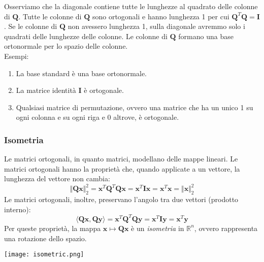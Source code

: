 \documentclass{article}
\begin{document}
            Osserviamo che la diagonale contiene tutte le lunghezze al quadrato delle colonne di $\mathbf{Q}$. 
            Tutte le colonne di $\mathbf{Q}$ sono ortogonali e hanno lunghezza 1 per cui $\mathbf{Q}^T\mathbf{Q} = \mathbf{I}$. Se le colonne 
            di $\mathbf{Q}$ non avessero lunghezza 1, sulla diagonale avremmo solo i quadrati delle lunghezze delle colonne. 
            Le colonne di $\mathbf{Q}$ formano una base ortonormale per lo spazio delle colonne. \\
            Esempi:
            \begin{enumerate}
                \item La base standard è una base ortonormale.
                \item La matrice identità $\mathbf{I}$ è ortogonale.
                \item Qualsiasi matrice di permutazione, ovvero una matrice che ha un unico 1 su ogni colonna e su ogni riga e 0 altrove, 
                 è ortogonale.
            \end{enumerate}


            \subsubsection{Isometria}
                Le matrici ortogonali, in quanto matrici, modellano delle mappe lineari. Le matrici ortogonali hanno la proprietà che,
                quando applicate a un vettore, la lunghezza del vettore non cambia:
                \[ \Vert \mathbf{Qx} \Vert_2^2 = \mathbf{x}^T \mathbf{Q}^T \mathbf{Qx} = \mathbf{x}^T \mathbf{I}\mathbf{x} = \mathbf{x}^T \mathbf{x} = \Vert \mathbf{x} \Vert_2^2\]
                Le matrici ortogonali, inoltre, preservano l'angolo tra due vettori (prodotto interno):
                \[ \langle \mathbf{Qx},\mathbf{Qy} \rangle = \mathbf{x}^T \mathbf{Q}^T\mathbf{Qy} = \mathbf{x}^T \mathbf{I} \mathbf{y} = \mathbf{x}^T\mathbf{y}\]
                Per queste proprietà, la mappa $\mathbf{x} \mapsto \mathbf{Qx}$ è un \emph{isometria} in $\mathbb{R}^n$, ovvero rappresenta 
                una rotazione dello spazio.
                \begin{center}\texttt{[image: isometric.png]}\end{center}
\end{document}
